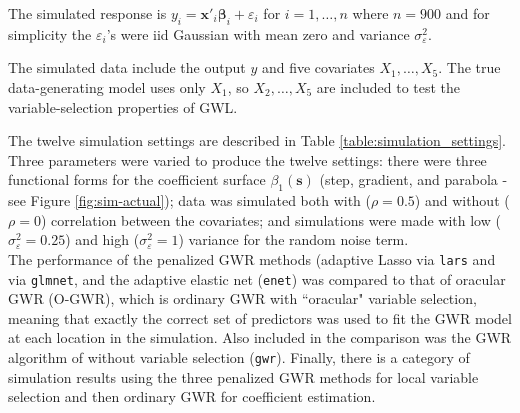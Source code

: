 \documentclass[authoryear, review, 11pt]{elsarticle}
\begin{document}
	The simulated response is $y_i = \bm{x}'_i \bm{\beta}_i + \varepsilon_i$ for $i=1, \dots, n$ where $n=900$ and for simplicity the $\varepsilon_i$'s were iid Gaussian with mean zero and variance $\sigma_\varepsilon^2$.%
	
	The simulated data include the output $y$ and five covariates $X_1, \dots, X_5$. The true data-generating model uses only $X_1$, so $X_2, \dots, X_5$ are included to test the variable-selection properties of GWL.
	
	The twelve simulation settings are described in Table \ref{table:simulation_settings}. Three parameters were varied to produce the twelve settings: there were three functional forms for the coefficient surface $\beta_1(\bm{s})$ (step, gradient, and parabola - see Figure \ref{fig:sim-actual}); data was simulated both with ($\rho = 0.5$) and without ($\rho = 0$) correlation between the covariates; and simulations were made with low ($\sigma_\varepsilon^2 = 0.25$) and high ($\sigma_\varepsilon^2 = 1$) variance for the random noise term.\\
	
	The performance of the penalized GWR methods (adaptive Lasso via \verb!lars! and via \verb!glmnet!, and the adaptive elastic net (\verb!enet!) was compared to that of oracular GWR (O-GWR), which is ordinary GWR with ``oracular" variable selection, meaning that exactly the correct set of predictors was used to fit the GWR model at each location in the simulation. Also included in the comparison was the GWR algorithm of \cite{Fotheringham:2002} without variable selection (\verb!gwr!). Finally, there is a category of simulation results using the three penalized GWR methods for local variable selection and then ordinary GWR for coefficient estimation.\\
	
\end{document}
